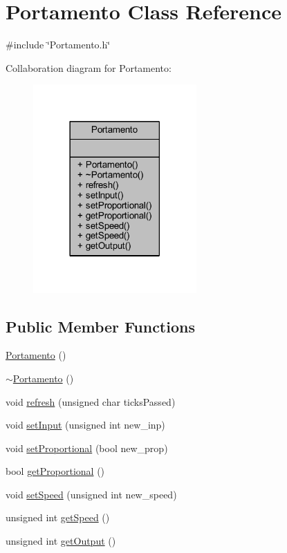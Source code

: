 \hypertarget{class_portamento}{}\section{Portamento Class Reference}
\label{class_portamento}


{\ttfamily \#include \char`\"{}Portamento.\+h\char`\"{}}



Collaboration diagram for Portamento\+:
\nopagebreak
\begin{figure}[H]
\begin{center}
\leavevmode
\includegraphics[width=177pt]{d0/da4/class_portamento__coll__graph}
\end{center}
\end{figure}
\subsection*{Public Member Functions}
\begin{DoxyCompactItemize}
\item 
\hyperlink{class_portamento_a80ed457562045ae8d49da317e6a7ba0d}{Portamento} ()
\item 
\hyperlink{class_portamento_a90f8e862c7a26ade2f7a955eea6da904}{$\sim$\+Portamento} ()
\item 
void \hyperlink{class_portamento_a4a5430c4e0561f9b37bbffdcbb936c43}{refresh} (unsigned char ticks\+Passed)
\item 
void \hyperlink{class_portamento_aa03a209b228dd0335cf103f1614d219a}{set\+Input} (unsigned int new\+\_\+inp)
\item 
void \hyperlink{class_portamento_aa28dcb234093a065e0970185eb107c78}{set\+Proportional} (bool new\+\_\+prop)
\item 
bool \hyperlink{class_portamento_a2cc6e550905558daac49cbef693c62fb}{get\+Proportional} ()
\item 
void \hyperlink{class_portamento_ac30ccb23ee5bc0dd6bb00215eb9f0805}{set\+Speed} (unsigned int new\+\_\+speed)
\item 
unsigned int \hyperlink{class_portamento_a6542d6becc564aaec446ec86104a8c2d}{get\+Speed} ()
\item 
unsigned int \hyperlink{class_portamento_ac9c42e58272962a5a7f7d0300ba2e595}{get\+Output} ()
\end{DoxyCompactItemize}


